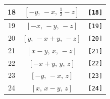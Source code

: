 \documentclass[fleqn,8pt]{jsarticle}
\begin{document}
\begin{longtable}{ccc}
18 & $\left[ - y,\, - x,\, \frac{1}{2} - z \right]$ & {\tt [18]} \\ \hline
19 & $\left[ - x,\, - y,\, - z \right]$ & {\tt [19]} \\ \hline
20 & $\left[ y,\, - x + y,\, - z \right]$ & {\tt [20]} \\ \hline
21 & $\left[ x - y,\, x,\, - z \right]$ & {\tt [21]} \\ \hline
22 & $\left[ - x + y,\, y,\, z \right]$ & {\tt [22]} \\ \hline
23 & $\left[ - y,\, - x,\, z \right]$ & {\tt [23]} \\ \hline
24 & $\left[ x,\, x - y,\, z \right]$ & {\tt [24]} \\
\end{longtable}
\end{document}

